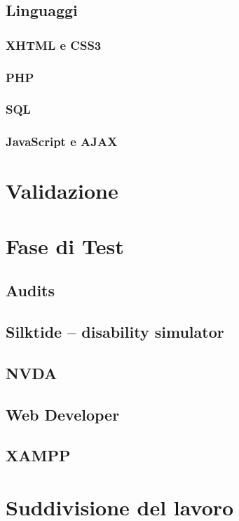 \documentclass[a4paper, oneside, openany, dvipsnames, table]{article}
\begin{document}
	\subsection{Linguaggi}
		
		\subsubsection{XHTML e CSS3}
			
		\subsubsection{PHP}
			
		\subsubsection{SQL}
			
		\subsubsection{JavaScript e AJAX}
			
\newpage
\section{Validazione}
	
\newpage
\section{Fase di Test}
	
	\subsection{Audits}
		
	\subsection{Silktide – disability simulator}
		
	\subsection{NVDA}
		
	\subsection{Web Developer}
		
	\subsection{XAMPP}
		
\newpage
\section{Suddivisione del lavoro}
	
						
\end{document}
